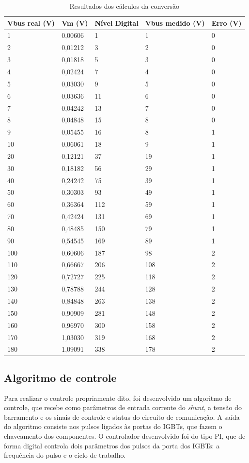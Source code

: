\begin{table}[H]
    \centering
    \caption{Resultados dos cálculos da conversão}
    \begin{tabular}{| m{6em} | m{4em} | m{6em} | m{7em} | m{4em} | } 
    \hline
     Vbus real (V)&  Vm (V)&  Nível Digital&  Vbus medido (V)&  Erro (V)\\
     \hline
		1	&0,00606	&1		&1		&0\\\hline
		2	&0,01212	&3		&2		&0\\\hline
		3	&0,01818	&5		&3		&0\\\hline
		4	&0,02424	&7		&4		&0\\\hline
		5	&0,03030	&9		&5		&0\\\hline
		6	&0,03636	&11		&6		&0\\\hline
		7	&0,04242	&13		&7		&0\\\hline
		8	&0,04848	&15		&8		&0\\\hline
		9	&0,05455	&16		&8		&1\\\hline
		10	&0,06061	&18		&9		&1\\\hline
		20	&0,12121	&37		&19		&1\\\hline
		30	&0,18182	&56		&29		&1\\\hline
		40	&0,24242	&75		&39		&1\\\hline
		50	&0,30303	&93		&49		&1\\\hline
		60	&0,36364	&112	&59		&1\\\hline
		70	&0,42424	&131	&69		&1\\\hline
		80	&0,48485	&150	&79		&1\\\hline
		90	&0,54545	&169	&89		&1\\\hline
		100	&0,60606	&187	&98		&2\\\hline
		110	&0,66667	&206	&108	&2\\\hline
		120	&0,72727	&225	&118	&2\\\hline
		130	&0,78788	&244	&128	&2\\\hline
		140	&0,84848	&263	&138	&2\\\hline
		150	&0,90909	&281	&148	&2\\\hline
		160	&0,96970	&300	&158	&2\\\hline
		170	&1,03030	&319	&168	&2\\\hline
		180	&1,09091	&338	&178	&2\\
     \hline
    \end{tabular}
    \label{table-vbus}
\end{table}

\subsection{Algoritmo de controle}
Para realizar o controle propriamente dito, foi desenvolvido um algoritmo de controle, que recebe como parâmetros de entrada corrente do \textit{shunt}, a tensão do barramento e os sinais de controle e status do circuito de comunicação. A saída do algoritmo consiste nos pulsos ligados às portas do IGBTs, que fazem o chaveamento dos componentes. O controlador desenvolvido foi do tipo PI, que de forma digital controla dois parâmetros dos pulsos da porta dos IGBTs: a frequência do pulso e o ciclo de trabalho.

